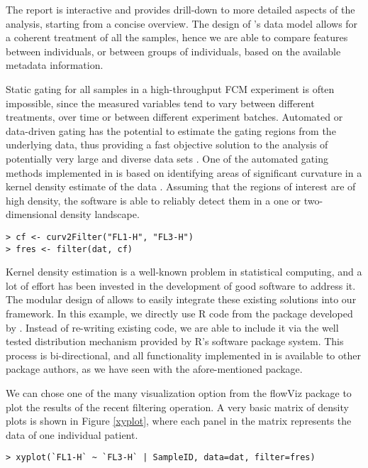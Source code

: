 \documentclass[10pt]{bmc_article}
\newenvironment{bmcformat}{\begin{raggedright}\baselineskip20pt\sloppy\setboolean{publ}{false}}{\end{raggedright}\baselineskip20pt\sloppy}
\begin{document}
\begin{bmcformat}
  The report is interactive and provides drill-down to more detailed
  aspects of the analysis, starting from a concise overview. The
  design of 's data model allows for a coherent
  treatment of all the samples, hence we are able to compare features
  between individuals, or between groups of individuals, based on the
  available metadata information.


  Static gating for all samples in a high-throughput FCM experiment is
  often impossible, since the measured variables tend to vary between
  different treatments, over time or between different experiment
  batches. Automated or data-driven gating has the potential to
  estimate the gating regions from the underlying data, thus providing
  a fast objective solution to the analysis of potentially very large
  and diverse data sets \citep{lo2008agf}. One of the automated gating
  methods implemented in  is based on identifying
  areas of significant curvature in a kernel density estimate of the
  data \citep{wand2008}. Assuming that the regions of interest are of
  high density, the software is able to reliably detect them in a one
  or two-dimensional density landscape.

\begin{verbatim}
> cf <- curv2Filter("FL1-H", "FL3-H")
> fres <- filter(dat, cf)
\end{verbatim}

Kernel density estimation is a well-known problem in statistical
computing, and a lot of effort has been invested in the development of
good software to address it. The modular design of 
allows to easily integrate these existing solutions into our
framework. In this example, we directly use R code from the
 package developed by \cite{wand2008}. Instead of
re-writing existing code, we are able to include it via the well
tested distribution mechanism provided by R's software package
system. This process is bi-directional, and all functionality
implemented in  is available to other package
authors, as we have seen with the afore-mentioned 
package.

We can chose one of the many visualization option from the flowViz
package to plot the results of the recent filtering operation. A very
basic matrix of density plots is shown in Figure \ref{xyplot}, where
each panel in the matrix represents the data of one individual
patient.

\begin{verbatim}
> xyplot(`FL1-H` ~ `FL3-H` | SampleID, data=dat, filter=fres)
\end{verbatim}


\end{bmcformat}
\end{document}

